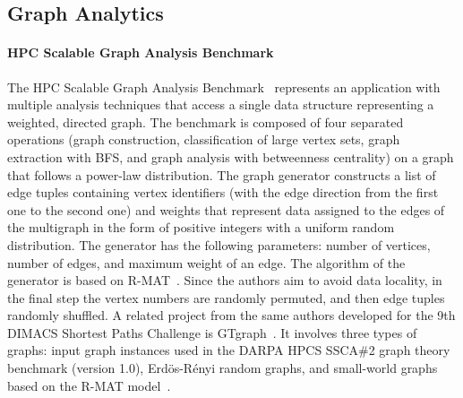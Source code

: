 \subsection{Graph Analytics}
\label{sec:generators_analytics}

\paragraph{HPC Scalable Graph Analysis Benchmark} The HPC Scalable Graph
Analysis Benchmark~\cite{HPCgraph,Bader:2005:DIH:2099301.2099360} represents an
application with multiple analysis techniques that access a single data
structure representing a weighted, directed graph. The benchmark is composed of
four separated operations (graph construction, classification of large vertex
sets, graph extraction with BFS, and graph analysis with betweenness centrality)
on a graph that follows a power-law distribution. The graph generator constructs a list of edge tuples containing vertex
identifiers (with the edge direction from the first one to the second one) and
weights that represent data assigned to the edges of the multigraph in the form
of positive integers with a uniform random distribution. The generator has the
following parameters: number of vertices, number of edges, and maximum weight of
an edge. The algorithm of the generator is based on R-MAT~\cite{DBLP:conf/sdm/ChakrabartiZF04}. Since the authors aim
to avoid data locality, in the final step the vertex numbers are randomly
permuted, and then edge tuples randomly shuffled. A related project from the same authors developed for the 9th DIMACS Shortest
Paths Challenge is GTgraph~\cite{GTgraph}. It involves three types of graphs:
input graph instances used in the DARPA HPCS SSCA\#2 graph theory benchmark
(version 1.0), Erd\"{o}s-R\'{e}nyi random graphs, and small-world graphs based
on the R-MAT model~\cite{DBLP:conf/sdm/ChakrabartiZF04}. 

